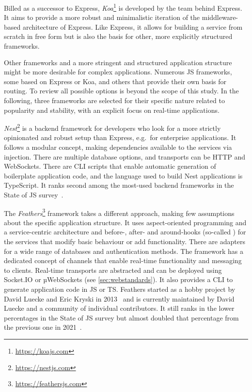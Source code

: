 Billed as a successor to Express, \emph{Koa}\footnote{\url{https://koajs.com}} is developed by the team behind Express.
It aims to provide a more robust and minimalistic iteration of the middleware-based architecture of Express.
Like Express, it allows for building a service from scratch in free form but is also the basis for other, more explicitly structured frameworks.

Other frameworks and a more stringent and structured application structure might be more desirable for complex applications.
Numerous \ac{JS} frameworks, some based on Express or Koa, and others that provide their own basis for routing.
To review all possible options is beyond the scope of this study.
In the following, three frameworks are selected for their specific nature related to popularity and stability, with an explicit focus on real-time applications.



\emph{Nest}\footnote{\url{https://nestjs.com}} is a backend framework for developers who look for a more strictly opinionated and robust setup than Express, e.g.\ for enterprise applications.
It follows a modular concept, making dependencies available to the services via injection.
There are multiple database options, and transports can be HTTP and WebSockets.
There are \ac{CLI} scripts that enable automatic generation of boilerplate application code, and the language used to build Nest applications is TypeScript.
It ranks second among the most-used backend frameworks in the State of JS survey~\parencite{mostUsedBackendFrameworks22}.

The \emph{Feathers}\footnote{\url{https://feathersjs.com}} framework takes a different approach, making few assumptions about the specific application structure.
It uses aspect-oriented programming and a service-centric architecture and before-, after- and around-hooks (so-called ) for the services that modify basic behaviour or add functionality.
There are adapters for a wide range of databases and authentication methods.
The framework has a dedicated concept of channels that enable real-time functionality and messaging to clients.
Real-time transports are abstracted and can be deployed using Socket.IO or µWebSockets (see \autoref{sec:webstandards}). It also provides a \ac{CLI} to generate application code in \ac{JS} or \ac{TS}.
Feathers started as a hobby project by David Luecke and Eric Kryski in 2013~\parencite{feathersFrameworkHistory} and is currently maintained by David Luecke and a community of individual contributors.
It still ranks in the lower percentages in the State of JS survey but almost doubled that percentage from the previous one in 2021~\parencite{mostUsedBackendFrameworks21}.

